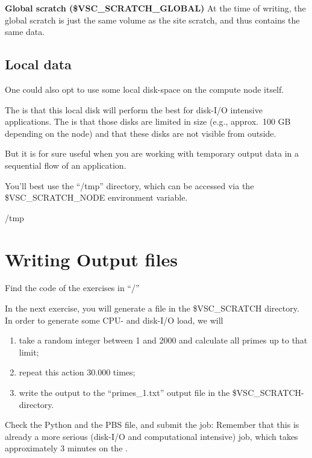 \textbf{Global scratch (\$VSC\_SCRATCH\_GLOBAL)}
At the time of writing, the global scratch is just the same
volume as the site scratch, and thus contains the same data.

\subsection{Local data}

One could also opt to use some local disk-space on the compute node itself.

The  is that this local disk will perform the best for
disk-I/O intensive applications.  The  is that those disks are
limited in size (e.g., approx.\ 100 GB depending on the node) and that these
disks are not visible from outside.

But it is for sure useful when you are working with temporary output data in a
sequential flow of an application.

You'll best use the ``/tmp'' directory, which can be accessed via the
\$VSC\_SCRATCH\_NODE environment variable.

\begin{prompt}
/tmp
\end{prompt}

\section{Writing Output files}

\begin{tip}
Find the code of the exercises in ``\tilde/\exampledir''
\end{tip}

In the next exercise, you will generate a file in the \$VSC\_SCRATCH directory.
In order to generate some CPU- and disk-I/O load, we will

\begin{enumerate}
\item  take a random integer between 1 and 2000 and calculate all primes up to that limit;
\item  repeat this action 30.000 times;
\item  write the output to the ``primes\_1.txt'' output file in the \$VSC\_SCRATCH-directory.
\end{enumerate}

Check the Python and the PBS file, and submit the job: Remember that this is
already a more serious (disk-I/O and computational intensive) job, which takes
approximately 3 minutes on the \hpc.

